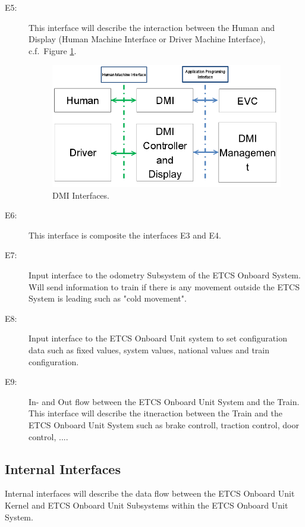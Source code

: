 \begin{description}
\item[E5:] This interface will describe the interaction between the Human and Display (Human Machine Interface or Driver Machine Interface), c.f.~Figure \ref{DMI Interfaces}.
\begin{figure}
\centering
\includegraphics[scale=0.6]{images/DMIinterfaces}
\caption{DMI Interfaces.}
\label{DMI Interfaces}
\end{figure}

\item[E6:] This interface is composite the interfaces E3 and E4.

\item[E7:] Input interface to the odometry Subsystem of the ETCS Onboard System. Will send information to train if there is any movement outside the ETCS System is leading such as "cold movement".

\item[E8:] Input interface to the ETCS Onboard Unit system to set configuration data such as fixed values, system values, national values and train configuration.

\item[E9:] In- and Out flow between the ETCS Onboard Unit System and the Train. This interface will describe the itneraction between the Train and the ETCS Onboard Unit System such as brake controll, traction control, door control, ....
\end{description}


\subsection{Internal Interfaces}
Internal interfaces will describe the data flow between the ETCS Onboard Unit Kernel and ETCS Onboard Unit Subsystems within the ETCS Onboard Unit System.

